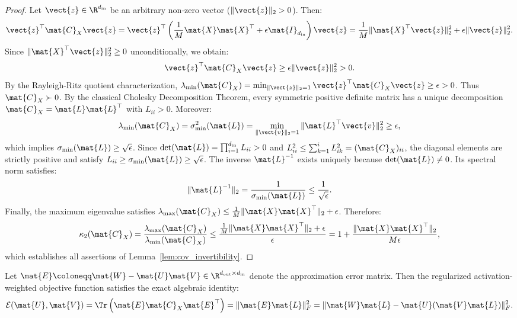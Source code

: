 \begin{proof}
Let $\vect{z} \in \R^{d_{\text{in}}}$ be an arbitrary non-zero vector ($\|\vect{z}\|_2 > 0$). Then:
\begin{equation}
\vect{z}^\top \mat{C}_X \vect{z} = \vect{z}^\top \left( \frac{1}{M} \mat{X} \mat{X}^\top + \epsilon \mat{I}_{d_{\text{in}}} \right) \vect{z} = \frac{1}{M} \|\mat{X}^\top \vect{z}\|_2^2 + \epsilon \|\vect{z}\|_2^2.
\end{equation}
Since $\|\mat{X}^\top \vect{z}\|_2^2 \ge 0$ unconditionally, we obtain:
\begin{equation}
\vect{z}^\top \mat{C}_X \vect{z} \ge \epsilon \|\vect{z}\|_2^2 > 0.
\end{equation}
By the Rayleigh-Ritz quotient characterization, $\lambda_{\min}(\mat{C}_X) = \min_{\|\vect{z}\|_2=1} \vect{z}^\top \mat{C}_X \vect{z} \ge \epsilon > 0$. Thus $\mat{C}_X \succ 0$.
By the classical Cholesky Decomposition Theorem, every symmetric positive definite matrix has a unique decomposition $\mat{C}_X = \mat{L} \mat{L}^\top$ with $L_{ii} > 0$. Moreover:
\begin{equation}
\lambda_{\min}(\mat{C}_X) = \sigma_{\min}^2(\mat{L}) = \min_{\|\vect{v}\|_2=1} \|\mat{L}^\top \vect{v}\|_2^2 \ge \epsilon,
\end{equation}
which implies $\sigma_{\min}(\mat{L}) \ge \sqrt{\epsilon}$. Since $\det(\mat{L}) = \prod_{i=1}^{d_{\text{in}}} L_{ii} > 0$ and $L_{ii}^2 \le \sum_{k=1}^i L_{ik}^2 = (\mat{C}_X)_{ii}$, the diagonal elements are strictly positive and satisfy $L_{ii} \ge \sigma_{\min}(\mat{L}) \ge \sqrt{\epsilon}$.
The inverse $\mat{L}^{-1}$ exists uniquely because $\det(\mat{L}) \ne 0$. Its spectral norm satisfies:
\begin{equation}
\|\mat{L}^{-1}\|_2 = \frac{1}{\sigma_{\min}(\mat{L})} \le \frac{1}{\sqrt{\epsilon}}.
\end{equation}
Finally, the maximum eigenvalue satisfies $\lambda_{\max}(\mat{C}_X) \le \frac{1}{M}\|\mat{X}\mat{X}^\top\|_2 + \epsilon$. Therefore:
\begin{equation}
\kappa_2(\mat{C}_X) = \frac{\lambda_{\max}(\mat{C}_X)}{\lambda_{\min}(\mat{C}_X)} \le \frac{\frac{1}{M}\|\mat{X}\mat{X}^\top\|_2 + \epsilon}{\epsilon} = 1 + \frac{\|\mat{X}\mat{X}^\top\|_2}{M \epsilon},
\end{equation}
which establishes all assertions of Lemma~\ref{lem:cov_invertibility}.
\end{proof}

\begin{lemma}
\label{lem:isometric_pullback}
Let $\mat{E} \coloneqq \mat{W} - \mat{U} \mat{V} \in \R^{d_{\text{out}} \times d_{\text{in}}}$ denote the approximation error matrix. Then the regularized activation-weighted objective function satisfies the exact algebraic identity:
\begin{equation}
\mathcal{E}(\mat{U}, \mat{V}) = \Tr\left( \mat{E} \mat{C}_X \mat{E}^\top \right) = \|\mat{E} \mat{L}\|_F^2 = \|\mat{W} \mat{L} - \mat{U} (\mat{V} \mat{L})\|_F^2.
\label{eq:isometric_pullback_identity}
\end{equation}
\end{lemma}

